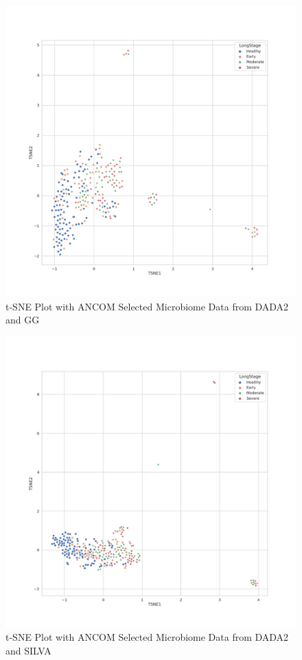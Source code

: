\documentclass[a4paper]{article}
\begin{document}
            \begin{figure}[p]
                \centering
                \includegraphics[width=0.6 \linewidth]{figures/tSNE/ANCOM/ANCOM.DADA2.gg.png}
                \caption{t-SNE Plot with ANCOM Selected Microbiome Data from DADA2 and GG}
                \label{fig:tsne-ANCOM-dada2-gg}
            \end{figure}

            \begin{figure}[p]
                \centering
                \includegraphics[width=0.6 \linewidth]{figures/tSNE/ANCOM/ANCOM.DADA2.silva.png}
                \caption{t-SNE Plot with ANCOM Selected Microbiome Data from DADA2 and SILVA}
                \label{fig:tsne-ANCOM-dada2-silva}
            \end{figure}
\end{document}
